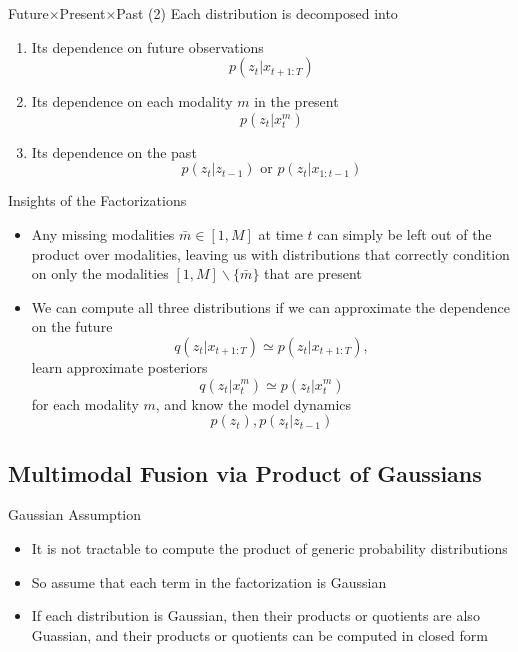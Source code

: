 \documentclass{beamer}
\begin{document}
\begin{frame}{Future$\times$Present$\times$Past (2)}
Each distribution is decomposed into
\begin{enumerate}
\item Its dependence on future observations\[
p(z_t|x_{t+1:T})
\]
\item Its dependence on each modality $m$ in the present\[
p(z_t|x_t^m)
\]
\item Its dependence on the past\[
p(z_t|z_{t-1})\text{ or }p(z_t|x_{1:t-1})
\]
\end{enumerate}
\end{frame}

\begin{frame}{Insights of the Factorizations}
\begin{itemize}
\item Any missing modalities $\bar m\in[1,M]$ at time $t$ can simply be left out of the product over modalities, leaving us with distributions that correctly condition on only the modalities $[1,M]\backslash\{\bar m\}$ that are present
\item We can compute all three distributions if we can approximate the dependence on the future\[
q(z_t|x_{t+1:T})\simeq p(z_t|x_{t+1:T}),
\]learn approximate posteriors\[
q(z_t|x_t^m)\simeq p(z_t|x_t^m)
\]for each modality $m$, and know the model dynamics\[
p(z_t),p(z_t|z_{t-1})
\]
\end{itemize}
\end{frame}

\subsection{Multimodal Fusion via Product of Gaussians}
\begin{frame}{Gaussian Assumption}
\begin{itemize}
\item It is not tractable to compute the product of generic probability distributions
\item So assume that each term in the factorization is Gaussian
\item If each distribution is Gaussian, then their products or quotients are also Guassian, and their products or quotients can be computed in closed form
\end{itemize}
\end{frame}
\end{document}
